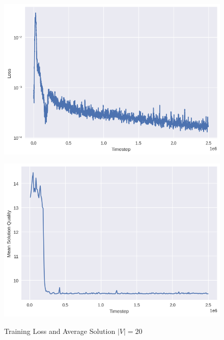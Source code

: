\documentclass{article}
\begin{document}
\begin{figure}[ht]
    \caption{Training Loss and Average Solution $|V| = 20$}
    \centering
    \includegraphics[scale=0.5]{../ER_20spin/eco/min_cover/network/loss.png}

    \includegraphics[scale=0.5]{../ER_20spin/eco/min_cover/network/training_curve.png}
    \label{fig:training-mvc-20}
\end{figure}




\end{document}
